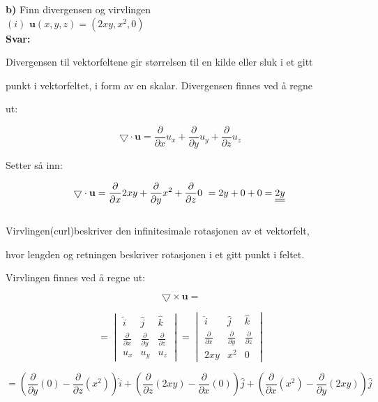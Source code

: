 \documentclass[a4paper,norsk,12pt]{article}
\begin{document}
\textbf{b)} { Finn divergensen og virvlingen} \\

$(i)$ \hspace{3mm} $\textbf{u}(x,y,z) = (2xy, x^2, 0) $ \\

\textbf{Svar:}

Divergensen til vektorfeltene gir størrelsen til en kilde eller sluk i et gitt 

punkt i vektorfeltet, i form av en skalar. Divergensen finnes ved å regne 

ut:

$$
\bigtriangledown \cdot \textbf{u} = \frac{\partial}{\partial x} u_x + \frac{\partial}{\partial y} u_y + \frac{\partial}{\partial z} u_z \
$$ 

Setter så inn:

$$
\def\doubleunderline#1{\underline{\underline{#1}}}
\bigtriangledown \cdot \textbf{u} = \frac{\partial}{\partial x} 2xy + \frac{\partial}{\partial y} x^2 + \frac{\partial}{\partial z} 0 \
= 2y + 0 + 0 = \doubleunderline{ 2y} \
$$ \\

Virvlingen(curl)beskriver den infinitesimale rotasjonen av et vektorfelt, 

hvor lengden og retningen beskriver rotasjonen i et gitt punkt i feltet. 

Virvlingen finnes ved å regne ut:

$$
\bigtriangledown \times \textbf{u} = 
$$

$$
=\begin{vmatrix}
\hat i & \hat j & \hat k \\
\frac{\partial}{\partial x} & \frac{\partial}{\partial y} & \frac{\partial}{\partial z} \\
u_x & u_y & u_z
\end{vmatrix}
=\begin{vmatrix}
\hat i & \hat j & \hat k \\
\frac{\partial}{\partial x} & \frac{\partial}{\partial y} & \frac{\partial}{\partial z} \\
2xy & x^2 & 0
\end{vmatrix}
$$

$$
= \left( \frac{\partial}{\partial y} (0) - \frac{\partial}{\partial z} (x^2) \right) \hat i + \left(\frac{\partial}{\partial z} (2xy) - \frac{\partial}{\partial x} (0) \right) \hat j + \left(\frac{\partial}{\partial x} (x^2) - \frac{\partial}{\partial y} (2xy) \right) \hat j
$$
\end{document}
